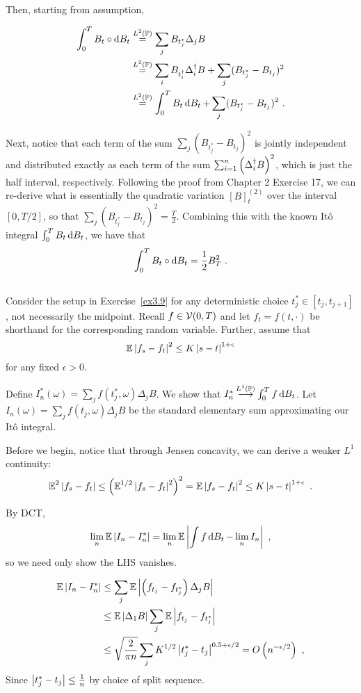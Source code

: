 \documentclass{article}
\begin{document}
Then, starting from assumption,

\begin{align*}
  \int_0^TB_t\circ\mathop{\mathrm{d} B_t }
  &\mathrel{\overset{L^2(\operatorname{\mathbb{P}})}{=}} \sum_jB_{t_j^*}\Delta_jB\\
  &\mathrel{\overset{L^2(\operatorname{\mathbb{P}})}{=}} \sum_iB_{t_i^\dag}\Delta_i^\dag B+\sum_j(B_{t_j^*}-B_{t_j})^2\\
  &\mathrel{\overset{L^2(\operatorname{\mathbb{P}})}{=}} \int_0^TB_t\mathop{\mathrm{d} B_t }+\sum_j(B_{t_j^*}-B_{t_j})^2\,\,.
\end{align*}

Next, notice that each term of the sum \(\sum_j(B_{t_j^*}-B_{t_j})^2\) is jointly independent and distributed exactly as each term of the sum \(\sum_{i=1}^n\left({\Delta_i^\dag B}\right)^2\), which is just the half interval, respectively. Following the proof from Chapter 2 Exercise 17, we can re-derive what is essentially the quadratic variation \([B]_t^{(2)}\) over the interval \([0, T/2]\), so that \(\sum_j(B_{t_j^*}-B_{t_j})^2=\frac{T}{2}\). Combining this with the known It\^{o} integral \(\int_0^TB_t\mathop{\mathrm{d} B_t }\), we have that
\[
  \int_0^TB_t\circ\mathop{\mathrm{d} B_t }=\frac{1}{2}B_T^2\,\,.
  \]

  \subsection{}

  Consider the setup in Exercise~\ref{ex3.9} for any deterministic choice \(t_j^*\in[t_j,t_{j+1}]\), not necessarily the midpoint. Recall \(f\in\mathcal{V}(0, T)\) and let \(f_t=f(t,\cdot)\) be shorthand for the corresponding random variable. Further, assume that
  \[
    \operatorname{\mathbb{E}}\left\lvert{f_s-f_t}\right\rvert^2\le K\left\lvert{s-t}\right\rvert^{1+\epsilon}
  \]
  for any fixed \(\epsilon>0\).

  Define \(I_n^*(\omega)=\sum_jf(t_j^*, \omega)\Delta_j B\). We show that \(I_n^*\mathbin{\overset{L^1(\operatorname{\mathbb{P}})}{\longrightarrow}} \int_0^T f\mathop{\mathrm{d} B_t }\). Let \(I_n(\omega)=\sum_jf(t_j, \omega)\Delta_j B\) be the standard elementary sum approximating our It\^{o} integral.

  Before we begin, notice that through Jensen concavity, we can derive a weaker \(L^1\) continuity:
  \[
  \operatorname{\mathbb{E}}^2\left\lvert{f_s-f_t}\right\rvert\le\left({  \operatorname{\mathbb{E}}^{1/2}\left\lvert{f_s-f_t}\right\rvert^2}\right)^2=\operatorname{\mathbb{E}}\left\lvert{f_s-f_t}\right\rvert^2\le K\left\lvert{s-t}\right\rvert^{1+\epsilon}\,\,.
\]

By DCT,
\[
  \lim_n\operatorname{\mathbb{E}}\left\lvert{I_n- I_n^*}\right\rvert=  \lim_n\operatorname{\mathbb{E}}\left\lvert{\int f\mathop{\mathrm{d} B_t }- \lim_nI_n}\right\rvert\,\,,
\]
so we need only show the LHS vanishes.
    
  \begin{align*}
    \operatorname{\mathbb{E}}\left\lvert{I_n-I_n^*}\right\rvert
    &\le\sum_j\operatorname{\mathbb{E}}\left\lvert{ \left({f_{t_j}-f_{t_j^*}}\right) \Delta_jB}\right\rvert\\
    &\le\operatorname{\mathbb{E}}\left\lvert{\Delta_1B}\right\rvert\sum_j\operatorname{\mathbb{E}}\left\lvert{f_{t_j}-f_{t_j^*}}\right\rvert\\
    &\le \sqrt{\frac{2}{\pi n}}\sum_jK^{1/2}\left\lvert{t_j^*-t_j}\right\rvert^{0.5+\epsilon/2}=O\left({n^{-\epsilon/2}}\right)\,\,,
  \end{align*}
  Since \(\left\lvert{t_j^*-t_j}\right\rvert\le \frac{1}{n}\) by choice of split sequence.
\end{document}
